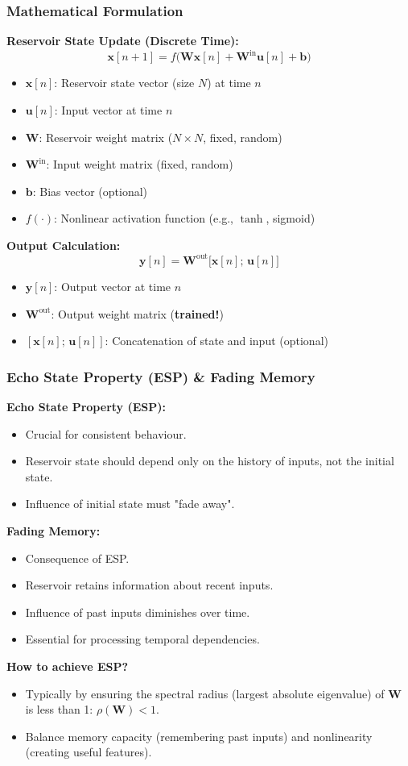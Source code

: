\documentclass{beamer}
\begin{document}
\begin{frame}
  \frametitle{Mathematical Formulation}
  \textbf{Reservoir State Update (Discrete Time):}
  \[
  \mathbf{x}[n+1] = f\bigl(\mathbf{W}\mathbf{x}[n] + \mathbf{W}^{\mathrm{in}}\mathbf{u}[n] + \mathbf{b}\bigr)
  \]
  \begin{itemize}
    \item $\mathbf{x}[n]$: Reservoir state vector (size $N$) at time $n$
    \item $\mathbf{u}[n]$: Input vector at time $n$
    \item $\mathbf{W}$: Reservoir weight matrix ($N \times N$, fixed, random)
    \item $\mathbf{W}^{\mathrm{in}}$: Input weight matrix (fixed, random)
    \item $\mathbf{b}$: Bias vector (optional)
    \item $f(\cdot)$: Nonlinear activation function (e.g., $\tanh$, sigmoid)
  \end{itemize}
  \pause
  \textbf{Output Calculation:}
  \[
  \mathbf{y}[n] = \mathbf{W}^{\mathrm{out}}\bigl[\mathbf{x}[n];\,\mathbf{u}[n]\bigr]
  \]
  \begin{itemize}
      \item $\mathbf{y}[n]$: Output vector at time $n$
      \item $\mathbf{W}^{\mathrm{out}}$: Output weight matrix (\textbf{trained!})
      \item $[\mathbf{x}[n];\,\mathbf{u}[n]]$: Concatenation of state and input (optional)
  \end{itemize}
\end{frame}

\begin{frame}
  \frametitle{Echo State Property (ESP) \& Fading Memory}
  \textbf{Echo State Property (ESP):}
  \begin{itemize}
      \item Crucial for consistent behaviour.
      \item Reservoir state should depend only on the history of inputs, not the initial state.
      \item Influence of initial state must "fade away".
  \end{itemize}
  \pause
  \textbf{Fading Memory:}
  \begin{itemize}
      \item Consequence of ESP.
      \item Reservoir retains information about recent inputs.
      \item Influence of past inputs diminishes over time.
      \item Essential for processing temporal dependencies.
  \end{itemize}
  \pause
  \textbf{How to achieve ESP?}
  \begin{itemize}
      \item Typically by ensuring the spectral radius (largest absolute eigenvalue) of $\mathbf{W}$ is less than 1: $\rho(\mathbf{W}) < 1$.
      \item Balance memory capacity (remembering past inputs) and nonlinearity (creating useful features).
  \end{itemize}
\end{frame}
\end{document}
